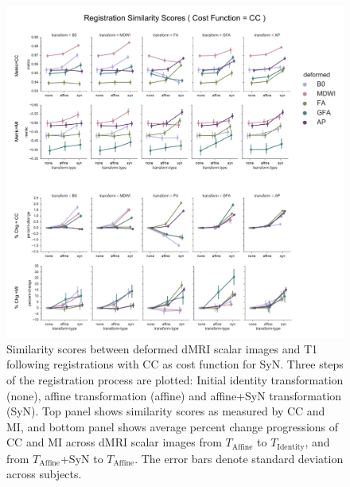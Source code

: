 \begin{figure}[H]
\includegraphics[width=\linewidth]{figure5}
\caption{Similarity scores between deformed dMRI scalar images and T1 following registrations with CC as cost function for SyN. 
Three steps of the registration process are plotted: Initial identity transformation (none), affine transformation (affine) and affine+SyN transformation (SyN).
Top panel shows similarity scores as measured by CC and MI, and bottom panel shows average percent change progressions of CC and MI across dMRI scalar images from \protect $T_{\text{Affine}}$ to \protect $T_{\text{Identity}}$, and from \protect $T_{\text{Affine}}$+SyN to \protect $T_{\text{Affine}}$. The error bars denote standard deviation across subjects.}
\centering
\label{fig:APfigure5}
\end{figure}

